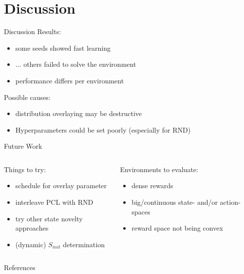 \documentclass[aspectratio=169]{beamer}
\begin{document}
\section{Discussion}
\begin{frame}{Discussion}
  Results:
  \begin{itemize}
    \item some seeds showed fast learning
    \item ... others failed to solve the environment
    \item performance differs per environment
  \end{itemize}
  \vfill
  Possible causes:
  \begin{itemize}
    \item distribution overlaying may be destructive
    \item Hyperparameters could be set poorly (especially for RND)
  \end{itemize}
\end{frame}

\begin{frame}{Future Work}
  \begin{columns}[T]
    \begin{column}{0.48\textwidth}
      Things to try:
      \begin{itemize}
        \item schedule for overlay parameter
        \item interleave PCL with RND
        \item try other state novelty approaches
        \item (dynamic) $S_{init}$ determination
      \end{itemize}
    \end{column}
    \begin{column}{0.48\textwidth}
      Environments to evaluate:
      \begin{itemize}
        \item dense rewards
        \item big/continuous state- and/or action-spaces
        \item reward space not being convex
      \end{itemize}
    \end{column}
  \end{columns}
\end{frame}

\begin{frame}{References}
  \printbibliography
\end{frame}
\end{document}
